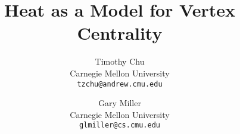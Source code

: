 


\title{Heat as a Model for Vertex Centrality}
\author{
  Timothy Chu \\
  Carnegie Mellon University\\
  \texttt{tzchu@andrew.cmu.edu}
  \and
  Gary Miller\\
  Carnegie Mellon University\\
  \texttt{glmiller@cs.cmu.edu} \\
}

\setcounter{page}{0}
\maketitle
\thispagestyle{empty}
\begin{abstract}

\end{abstract}


\clearpage


\begin{appendix}
\end{appendix}

